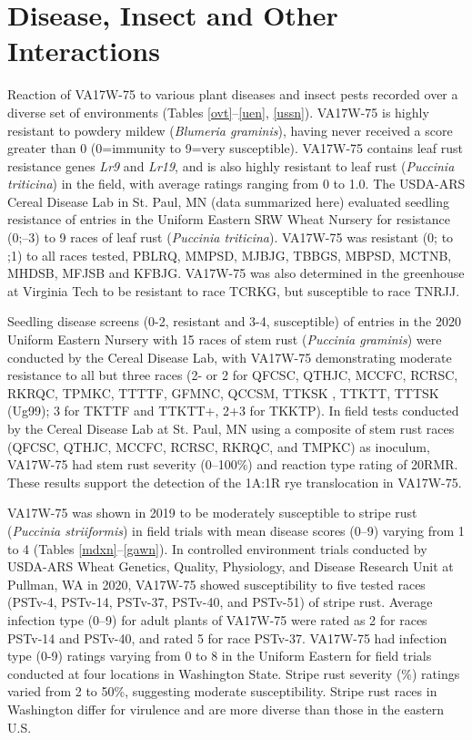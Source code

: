 \documentclass[12pt, letterpaper]{article}
\begin{document}
\section{Disease, Insect and Other Interactions}

Reaction of VA17W-75 to various plant diseases and insect pests recorded over a diverse set of environments (Tables \ref{ovt}--\ref{uen}, \ref{ussn}). VA17W-75 is highly resistant to powdery mildew (\textit{Blumeria graminis}), having never received a score greater than 0 (0=immunity to 9=very susceptible).  VA17W-75 contains leaf rust resistance genes \textit{Lr9} and \textit{Lr19}, and is also highly resistant to leaf rust (\textit{Puccinia triticina}) in the field, with average ratings ranging from 0 to 1.0.  The USDA-ARS Cereal Disease Lab in St. Paul, MN (data summarized here) evaluated seedling resistance of entries in the Uniform Eastern SRW Wheat Nursery for resistance (0;--3) to 9 races of leaf rust (\textit{Puccinia triticina}). VA17W-75 was resistant (0; to ;1) to all races tested, PBLRQ, MMPSD, MJBJG, TBBGS, MBPSD, MCTNB, MHDSB, MFJSB and KFBJG. VA17W-75 was also determined in the greenhouse at Virginia Tech to be resistant to race TCRKG, but susceptible to race TNRJJ. 

Seedling disease screens (0-2, resistant and 3-4, susceptible) of entries in the 2020 Uniform Eastern Nursery with 15 races of stem rust (\textit{Puccinia graminis}) were conducted by the Cereal Disease Lab, with VA17W-75 demonstrating moderate resistance to all but three races (2- or 2 for QFCSC, QTHJC, MCCFC, RCRSC, RKRQC, TPMKC, TTTTF, GFMNC, QCCSM, TTKSK , TTKTT, TTTSK (Ug99); 3 for TKTTF and TTKTT+, 2+3 for TKKTP). In field tests conducted by the Cereal Disease Lab at St. Paul, MN using a composite of stem rust races (QFCSC, QTHJC, MCCFC, RCRSC, RKRQC, and TMPKC) as inoculum, VA17W-75 had stem rust severity (0--100\%) and reaction type rating of 20RMR. These results support the detection of the 1A:1R rye translocation in VA17W-75. 

VA17W-75 was shown in 2019 to be moderately susceptible to stripe rust (\textit{Puccinia striiformis}) in field trials with mean disease scores (0--9) varying from 1 to 4 (Tables \ref{mdxn}--\ref{gawn}).  In controlled environment trials conducted by USDA-ARS Wheat Genetics, Quality, Physiology, and Disease Research Unit at Pullman, WA in 2020, VA17W-75 showed susceptibility to five tested races (PSTv-4, PSTv-14, PSTv-37, PSTv-40, and PSTv-51) of stripe rust. Average infection type (0--9) for adult plants of VA17W-75 were rated as 2 for races PSTv-14 and PSTv-40, and rated 5 for race PSTv-37. VA17W-75 had infection type (0-9) ratings varying from 0 to 8 in the Uniform Eastern for field trials conducted at four locations in Washington State. Stripe rust severity (\%) ratings varied from 2 to 50\%, suggesting moderate susceptibility. Stripe rust races in Washington differ for virulence and are more diverse than those in the eastern U.S. 
\end{document}
